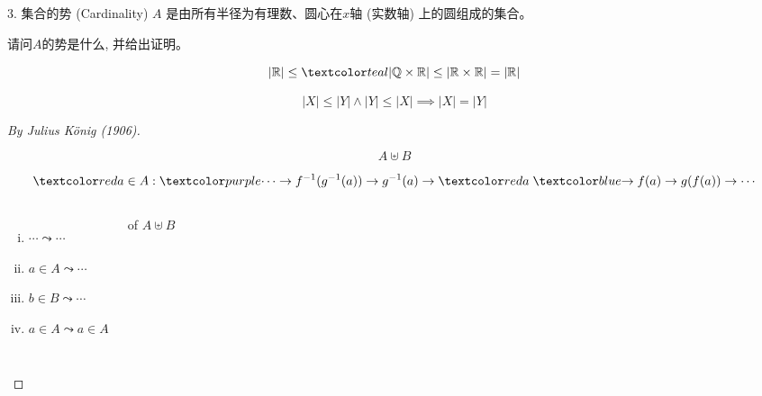 \begin{frame}{}
  \begin{exampleblock}{$3.$ 集合的势 (Cardinality)}
    $A$ 是由所有半径为有理数、圆心在$x$轴 (实数轴) 上的圆组成的集合。

    请问$A$的势是什么, 并给出证明。
  \end{exampleblock}

  \pause
  \vspace{0.30cm}
  \[
    |\R| \le \teal{|\Q \times \R|} \le |\R \times \R| = |\R|
  \]
\end{frame}

\begin{frame}{}


  \vspace{0.30cm}
  \begin{theorem}
    \[
      |X| \le |Y| \land |Y| \le |X| \implies |X| = |Y|
    \]
  \end{theorem}
\end{frame}

\begin{frame}{}
  \begin{proof}[By Julius K\"{o}nig (1906)]
    \pause
    \begin{center}
      \[
	A \uplus B
      \]
    \end{center}

    \pause
    \[
      \red{a \in A}: \purple{\cdots \to f^{-1}(g^{-1}(a)) \to g^{-1}(a) \to}\; \red{a} \;\blue{\to f(a) \to g(f(a)) \to \cdots}
    \]

    \begin{columns}
	\pause
	\begin{enumerate}[(i)]
	  \item $\cdots \leadsto \cdots$
	  \item $a \in A \leadsto \cdots$
	  \item $b \in B \leadsto \cdots$
	  \item $a \in A \leadsto a \in A$
	\end{enumerate}
        \pause
	\begin{center}
	  { of $A \uplus B$}
	\end{center}
    \end{columns}
  \end{proof}
\end{frame}

\begin{frame}{}
\end{frame}
